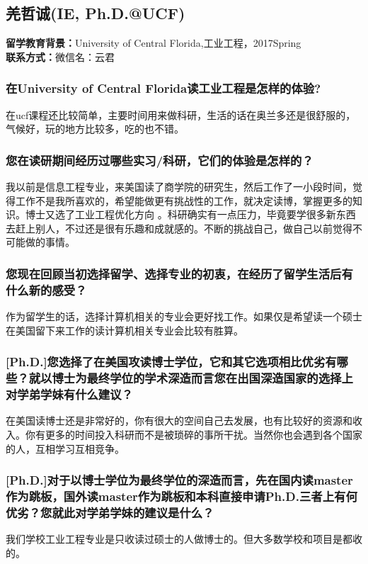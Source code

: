 \documentclass[a4paper,UTF8]{book}
\begin{document}
\clearpage
\subsection{羌哲诚(IE, Ph.D.@UCF)}
    \textbf{留学教育背景：}University of Central Florida,工业工程，2017Spring\\
    \textbf{联系方式：}微信名：云君

    \subsubsection*{在University of Central Florida读工业工程是怎样的体验?}
    在ucf课程还比较简单，主要时间用来做科研，生活的话在奥兰多还是很舒服的，气候好，玩的地方比较多，吃的也不错。

    \subsubsection*{您在读研期间经历过哪些实习/科研，它们的体验是怎样的？}
    我以前是信息工程专业，来美国读了商学院的研究生，然后工作了一小段时间，觉得工作不是我所喜欢的，希望能做更有挑战性的工作，就决定读博，掌握更多的知识。博士又选了工业工程优化方向 。科研确实有一点压力，毕竟要学很多新东西去赶上别人，不过还是很有乐趣和成就感的。不断的挑战自己，做自己以前觉得不可能做的事情。

    \subsubsection*{您现在回顾当初选择留学、选择专业的初衷，在经历了留学生活后有什么新的感受？}
    作为留学生的话，选择计算机相关的专业会更好找工作。如果仅是希望读一个硕士在美国留下来工作的读计算机相关专业会比较有胜算。

    \subsubsection*{[Ph.D.]您选择了在美国攻读博士学位，它和其它选项相比优劣有哪些？就以博士为最终学位的学术深造而言您在出国深造国家的选择上对学弟学妹有什么建议？}
    在美国读博士还是非常好的，你有很大的空间自己去发展，也有比较好的资源和收入。你有更多的时间投入科研而不是被琐碎的事所干扰。当然你也会遇到各个国家的人，互相学习互相竞争。 

    \subsubsection*{[Ph.D.]对于以博士学位为最终学位的深造而言，先在国内读master作为跳板，国外读master作为跳板和本科直接申请Ph.D.三者上有何优劣？您就此对学弟学妹的建议是什么？}
    我们学校工业工程专业是只收读过硕士的人做博士的。但大多数学校和项目是都收的。
\end{document}
